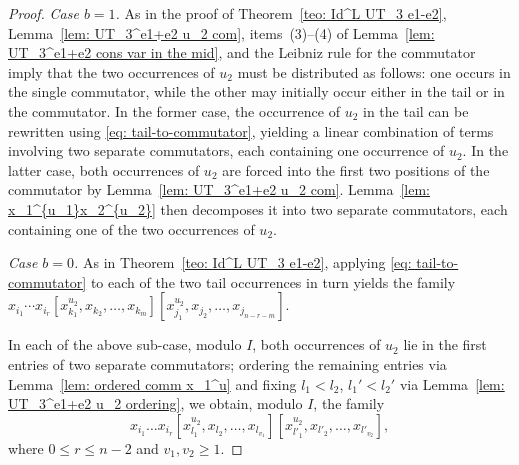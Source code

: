 \documentclass[a4paper,reqno]{amsart}
\theoremstyle{definition}
\numberwithin{equation}{section}
\numberwithin{theorem}{section}
\begin{document}
\begin{proof}
\smallskip

\emph{Case $b=1$.} As in the proof of Theorem~\ref{teo: Id^L UT_3 e1-e2}, Lemma~\ref{lem: UT_3^e1+e2 u_2 com}, items~(3)--(4) of Lemma~\ref{lem: UT_3^e1+e2 cons var in the mid}, and the Leibniz rule for the commutator imply that the two occurrences of $u_2$ must be distributed as follows: one occurs in the single commutator, while the other may initially occur either in the tail or in the commutator.
In the former case, the occurrence of $u_2$ in the tail can be rewritten using \eqref{eq: tail-to-commutator}, yielding a linear combination of terms involving two separate commutators, each containing one occurrence of $u_2$. In the latter case, both occurrences of $u_2$ are forced into the first two positions of the commutator by Lemma~\ref{lem: UT_3^e1+e2 u_2 com}. Lemma~\ref{lem: x_1^{u_1}x_2^{u_2}} then decomposes it into two separate commutators, each containing one of the two occurrences of $u_2$.



\smallskip

\emph{Case $b=0$.} As in Theorem~\ref{teo: Id^L UT_3 e1-e2}, applying \eqref{eq: tail-to-commutator} to each of the two tail occurrences in turn yields the family $x_{i_1}\cdots x_{i_r}[x_{k_1}^{u_2},x_{k_2},\ldots,x_{k_m}][x_{j_1}^{u_2},x_{j_2},\ldots,x_{j_{n-r-m}}]$.

\smallskip

In each of the above sub-case, modulo $I$, both occurrences of $u_2$ lie in the first entries of two separate commutators; ordering the remaining entries via Lemma~\ref{lem: ordered comm x_1^u} and fixing $l_1<l_2$, $l_1'<l_2'$ via Lemma~\ref{lem: UT_3^e1+e2 u_2 ordering}, we obtain, modulo $I$, the family
     \begin{equation}\label{eq: no Id u_2 u_2 e1+e2}
           x_{i_{1}}\dots x_{i_{r}}[x_{l_1}^{u_{2}},x_{l_2},\dots,x_{l_{v_1}}][x_{l'_1}^{u_{2}},x_{l'_2},\dots,x_{l'_{v_2}}],
     \end{equation}
where $0\leq r\leq n-2$ and $v_1,v_2 \geq 1$.




\end{proof}
\end{document}
